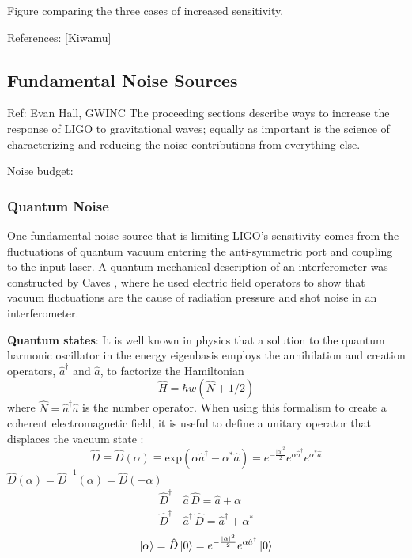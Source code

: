 		
		Figure comparing the three cases of increased sensitivity.
		
		References: [Kiwamu]
		
		\subsection{Fundamental Noise Sources}
		Ref: Evan Hall, GWINC
		The proceeding sections describe ways to increase the response of LIGO to gravitational waves; equally as important is the science of characterizing and reducing the noise contributions from everything else.
		
		Noise budget:
		
		\subsubsection{Quantum Noise}

		One fundamental noise source that is limiting LIGO's sensitivity comes from the fluctuations of quantum vacuum entering the anti-symmetric port and coupling to the input laser. A quantum mechanical description of an interferometer was constructed by Caves \cite{CavesQMNoise}\cite{Caves2photon} \cite{CavesOscillator}, where he used electric field operators to show that vacuum fluctuations are the cause of radiation pressure and shot noise in an interferometer.
		
		\textbf{Quantum states}:
		It is well known in physics \cite{Shankar} \cite{Griffiths} that a solution to the quantum harmonic oscillator in the energy eigenbasis employs the annihilation and creation  operators, $\hat{a}^{\dagger}$ and $\hat{a}$, to factorize the Hamiltonian
		\begin{equation}
		\hat{H} = \hbar w (\hat{N} + 1/2)
		\end{equation} 
		where $\hat{N} = \hat{a}^{\dagger}  \hat{a}$ is the number operator.  When using this formalism to create a coherent electromagnetic field, it is useful to define a unitary operator that displaces the vacuum state \cite{GerryKnight}:
		\begin{equation}
		\hat{D} \equiv \hat{D}(\alpha) \equiv \text{exp}(\alpha \hat{a}^{\dagger} - \alpha^{*} \hat{a} ) = e^{-\frac{\vert{\alpha}\vert^2}{2}} e^{\alpha \hat{a}^{\dagger} } e^{\alpha^{*} \hat{a} }
		\end{equation}
		$\hat{D}(\alpha) = \hat{D}^{-1}(\alpha) = \hat{D}(-\alpha)$
		\begin{equation}
		\begin{aligned}
		\hat{D}^\dagger&\, \hat{a} 		\,\hat{D}			= \hat{a} + \alpha \\ 
		\hat{D}^\dagger&\, \hat{a}^\dagger \,\hat{D} 		= \hat{a}^\dagger + \alpha^*
		\end{aligned}
		\end{equation}
		\begin{equation}
		\ket{\alpha} = \hat{D} \ket{0} =  e^{-\frac{\vert{\alpha}\vert^2}{2}} e^{\alpha \hat{a}^{\dagger} } \ket{0}
		\end{equation}
		
